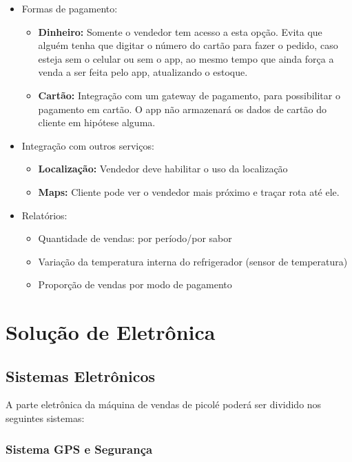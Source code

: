 \begin{itemize}
	\item Formas de pagamento:
    \begin{itemize}
		\item \textbf{Dinheiro:} Somente o vendedor tem acesso a esta opção. Evita que alguém tenha que digitar o número do cartão para fazer o pedido, caso esteja sem o celular ou sem o app, ao mesmo tempo que ainda força a venda a ser feita pelo app, atualizando o estoque.

        \item \textbf{Cartão:} Integração com um gateway de pagamento, para possibilitar o pagamento em cartão. O app não armazenará os dados de cartão do cliente em hipótese alguma.
  	\end{itemize}

	\item Integração com outros serviços:
  	\begin{itemize}
    	\item \textbf{Localização:} Vendedor deve habilitar o uso da localização
    	\item \textbf{Maps:} Cliente pode ver o vendedor mais próximo e traçar rota até ele.
  	\end{itemize}

	\item Relatórios:
  	\begin{itemize}
        \item Quantidade de vendas: por período/por sabor
        \item Variação da temperatura interna do refrigerador (sensor de temperatura)
        \item Proporção de vendas por modo de pagamento
  	\end{itemize}
\end{itemize}


\section{Solução de Eletrônica}

\subsection{Sistemas Eletrônicos}

A parte eletrônica da máquina de vendas de picolé poderá ser dividido nos seguintes sistemas:

\subsubsection{Sistema GPS e Segurança}

